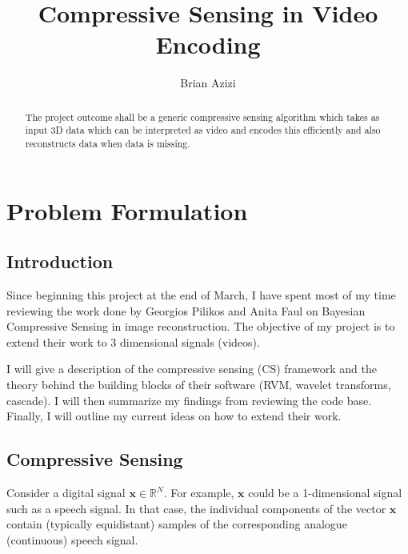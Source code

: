 \documentclass[final,3p,times,twocolumn]{report}
\let\bs\boldsymbol
\begin{document}
\title{Compressive Sensing in Video Encoding}


\author{Brian Azizi}


\renewcommand{\abstractname}{Project Outcome}
\begin{abstract}                
The project outcome shall be a generic compressive sensing algorithm which takes as input 3D data which can be interpreted as video and encodes this efficiently and also reconstructs data when data is missing.
\end{abstract}

\tableofcontents



\chapter{Problem Formulation}
\label{chap:Intro}
\section{Introduction}
Since beginning this project at the end of March, I have spent most of my time reviewing the work done by Georgios Pilikos and Anita Faul on Bayesian Compressive Sensing in image reconstruction.
The objective of my project is to extend their work to 3 dimensional signals (videos).

I will give a description of the compressive sensing (CS) framework and the theory behind the building blocks of their software (RVM, wavelet transforms, cascade).
I will then summarize my findings from reviewing the code base.
Finally, I will outline my current ideas on how to extend their work.

\section{Compressive Sensing}
Consider a digital signal $\bs x \in \mathbb{R}^N$. 
For example, $\bs x$ could be a 1-dimensional signal such as a speech signal.
In that case, the individual components of the vector $\bs x$ contain (typically equidistant) samples of the corresponding analogue (continuous) speech signal.
\end{document}
